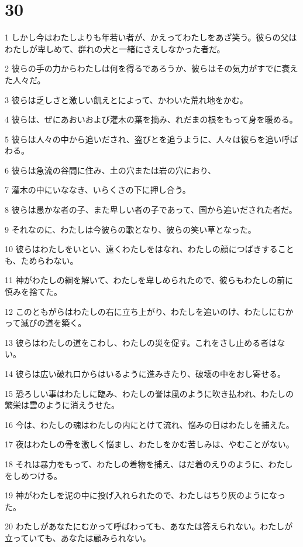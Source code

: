 \chapter{30}

\par 1 しかし今はわたしよりも年若い者が、かえってわたしをあざ笑う。彼らの父はわたしが卑しめて、群れの犬と一緒にさえしなかった者だ。
\par 2 彼らの手の力からわたしは何を得るであろうか、彼らはその気力がすでに衰えた人々だ。
\par 3 彼らは乏しさと激しい飢えとによって、かわいた荒れ地をかむ。
\par 4 彼らは、ぜにあおいおよび灌木の葉を摘み、れだまの根をもって身を暖める。
\par 5 彼らは人々の中から追いだされ、盗びとを追うように、人々は彼らを追い呼ばわる。
\par 6 彼らは急流の谷間に住み、土の穴または岩の穴におり、
\par 7 灌木の中にいななき、いらくさの下に押し合う。
\par 8 彼らは愚かな者の子、また卑しい者の子であって、国から追いだされた者だ。
\par 9 それなのに、わたしは今彼らの歌となり、彼らの笑い草となった。
\par 10 彼らはわたしをいとい、遠くわたしをはなれ、わたしの顔につばきすることも、ためらわない。
\par 11 神がわたしの綱を解いて、わたしを卑しめられたので、彼らもわたしの前に慎みを捨てた。
\par 12 このともがらはわたしの右に立ち上がり、わたしを追いのけ、わたしにむかって滅びの道を築く。
\par 13 彼らはわたしの道をこわし、わたしの災を促す。これをさし止める者はない。
\par 14 彼らは広い破れ口からはいるように進みきたり、破壊の中をおし寄せる。
\par 15 恐ろしい事はわたしに臨み、わたしの誉は風のように吹き払われ、わたしの繁栄は雲のように消えうせた。
\par 16 今は、わたしの魂はわたしの内にとけて流れ、悩みの日はわたしを捕えた。
\par 17 夜はわたしの骨を激しく悩まし、わたしをかむ苦しみは、やむことがない。
\par 18 それは暴力をもって、わたしの着物を捕え、はだ着のえりのように、わたしをしめつける。
\par 19 神がわたしを泥の中に投げ入れられたので、わたしはちり灰のようになった。
\par 20 わたしがあなたにむかって呼ばわっても、あなたは答えられない。わたしが立っていても、あなたは顧みられない。
